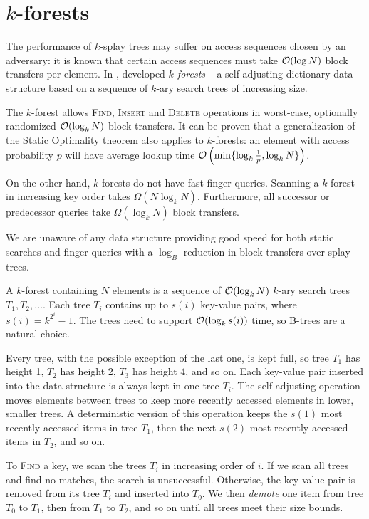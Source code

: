 \chapter{$k$-forests}
\label{chapter:kforest}
The performance of $k$-splay trees may suffer on access sequences chosen
by an adversary: it is known that certain access sequences must
take $\mathcal{O}(\log N)$ block transfers per element.
In \citeyear{martel}, \citeauthor{martel} developed \emph{$k$-forests} --
a self-adjusting dictionary data structure based on a sequence of
$k$-ary search trees of increasing size.

The $k$-forest allows \textsc{Find}, \textsc{Insert} and \textsc{Delete}
operations in worst-case, optionally randomized $\mathcal{O}(\log_k N)$ block transfers.
It can be proven that a generalization of the Static Optimality theorem
also applies to $k$-forests: an element with access probability $p$
will have average lookup time $\mathcal{O}\left(\min\{\log_k \frac{1}{p}, \log_k
N\}\right)$.


On the other hand, $k$-forests do not have fast finger queries. Scanning
a $k$-forest in increasing key order takes $\Omega(N\log_k N)$. Furthermore,
all successor or predecessor queries take $\Omega(\log_k N)$ block transfers.

We are unaware of any data structure providing good speed for both static
searches and finger queries with a $\log_B$ reduction in block transfers
over splay trees.

A $k$-forest containing $N$ elements is a sequence of $\mathcal{O}(\log_k N)$ $k$-ary
search trees $T_1, T_2, \ldots$. Each tree $T_i$ contains up to $s(i)$ key-value
pairs, where $s(i) = k^{2^i} - 1$. The trees need to support $\mathcal{O}(\log_k s(i))$
time, so B-trees are a natural choice.

Every tree, with the possible exception of the last one, is kept full,
so tree $T_1$ has height 1, $T_2$ has height 2, $T_3$ has height 4, and so on.
Each key-value pair inserted into the data structure is always kept in one
tree $T_i$. The self-adjusting operation moves elements between trees to
keep more recently accessed elements in lower, smaller trees.
A deterministic version of this operation keeps the $s(1)$ most recently
accessed items in tree $T_1$, then the next $s(2)$ most recently accessed
items in $T_2$, and so on.

To \textsc{Find} a key, we scan the trees $T_i$ in increasing order of $i$.
If we scan all trees and find no matches, the search is unsuccessful.
Otherwise, the key-value pair is removed from its tree $T_i$ and inserted
into $T_0$. We then \emph{demote} one item from tree $T_0$ to $T_1$,
then from $T_1$ to $T_2$, and so on until all trees meet their size bounds.

